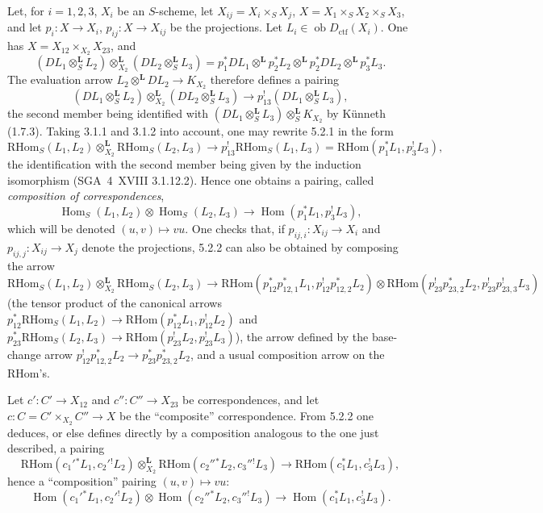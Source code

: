 \documentclass[11pt]{article}
\DeclareMathOperator{\Hom}{Hom}
\providecommand{\RHom}{\mathrm{RHom}}
\providecommand{\RHom}{\mathrm{RHom}}
\providecommand{\Hom}{\operatorname{Hom}}
\providecommand{\RHom}{\mathrm R\mathcal{H}om}
\providecommand{\RHom}{\mathrm{RHom}}
\begin{document}
Let, for $i=1,2,3$, $X_i$ be an $S$-scheme, let $X_{ij}=X_i\times_SX_j$, $X=X_1\times_SX_2\times_SX_3$, and let $p_i:X\to X_i$, $p_{ij}:X\to X_{ij}$ be the projections. Let $L_i\in\operatorname{ob}D_{\mathrm{ctf}}(X_i)$. One has $X=X_{12}\times_{X_2}X_{23}$, and
\[
(DL_1\otimes_S^{\mathbf L}L_2)\otimes_{X_2}^{\mathbf L}(DL_2\otimes_S^{\mathbf L}L_3)
=p_1^*DL_1\otimes^{\mathbf L}p_2^*L_2\otimes^{\mathbf L}p_2^*DL_2\otimes^{\mathbf L}p_3^*L_3.
\]
The evaluation arrow $L_2\otimes^{\mathbf L}DL_2\to K_{X_2}$ therefore defines a pairing
\begin{equation}
\tag{5.2.1}
(DL_1\otimes_S^{\mathbf L}L_2)\otimes_{X_2}^{\mathbf L}(DL_2\otimes_S^{\mathbf L}L_3)\longrightarrow p_{13}^!(DL_1\otimes_S^{\mathbf L}L_3),
\end{equation}
the second member being identified with $(DL_1\otimes_S^{\mathbf L}L_3)\otimes_S^{\mathbf L}K_{X_2}$ by Künneth (1.7.3). Taking 3.1.1 and 3.1.2 into account, one may rewrite 5.2.1 in the form
\begin{equation}
\tag{5.2.2}
\RHom_S(L_1,L_2)\otimes_{X_2}^{\mathbf L}\RHom_S(L_2,L_3)\longrightarrow p_{13}^!\RHom_S(L_1,L_3)=\RHom(p_1^*L_1,p_3^!L_3),
\end{equation}
the identification with the second member being given by the induction isomorphism (SGA~4~XVIII 3.1.12.2). Hence one obtains a pairing, called \emph{composition of correspondences},
\begin{equation}
\tag{5.2.3}
\Hom_S(L_1,L_2)\otimes\Hom_S(L_2,L_3)\longrightarrow\Hom(p_1^*L_1,p_3^!L_3),
\end{equation}
which will be denoted $(u,v)\mapsto vu$. One checks that, if $p_{ij,i}:X_{ij}\to X_i$ and $p_{ij,j}:X_{ij}\to X_j$ denote the projections, 5.2.2 can also be obtained by composing the arrow
\[
\RHom_S(L_1,L_2)\otimes_{X_2}^{\mathbf L}\RHom_S(L_2,L_3)
\longrightarrow
\RHom(p_{12}^*p_{12,1}^*L_1,p_{12}^!p_{12,2}^*L_2)
\otimes
\RHom(p_{23}^!p_{23,2}^*L_2,p_{23}^!p_{23,3}^!L_3)
\]
(the tensor product of the canonical arrows $p_{12}^*\RHom_S(L_1,L_2)\to\RHom(p_{12}^*L_1,p_{12}^!L_2)$ and $p_{23}^*\RHom_S(L_2,L_3)\to\RHom(p_{23}^!L_2,p_{23}^!L_3)$), the arrow defined by the base-change arrow $p_{12}^!p_{12,2}^*L_2\to p_{23}^*p_{23,2}^*L_2$, and a usual composition arrow on the $\RHom$'s.

Let $c':C'\to X_{12}$ and $c'':C''\to X_{23}$ be correspondences, and let $c:C=C'\times_{X_2}C''\to X$ be the ``composite'' correspondence. From 5.2.2 one deduces, or else defines directly by a composition analogous to the one just described, a pairing
\begin{equation}
\tag{5.2.4}
\RHom(c_1'{}^*L_1,c_2'{}^!L_2)\otimes_{X_2}^{\mathbf L}\RHom(c_2''{}^*L_2,c_3''{}^!L_3)
\longrightarrow\RHom(c_1^*L_1,c_3^!L_3),
\end{equation}
hence a ``composition'' pairing $(u,v)\mapsto vu$:
\begin{equation}
\tag{5.2.5}
\Hom(c_1'{}^*L_1,c_2'{}^!L_2)\otimes\Hom(c_2''{}^*L_2,c_3''{}^!L_3)
\longrightarrow\Hom(c_1^*L_1,c_3^!L_3).
\end{equation}
\end{document}
